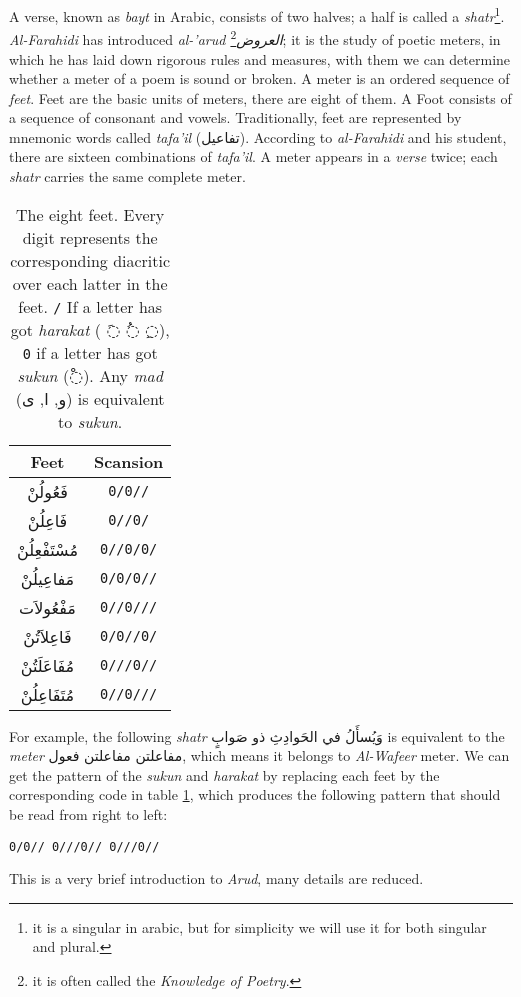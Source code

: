 \documentclass[12pt]{report}
\begin{document}
A verse, known as \textit{bayt} in Arabic, consists of two halves; a half is
called a \textit{shatr}\footnote{it is a singular in arabic, but for simplicity
we will use it for both singular and plural.}. %
\textit{Al-Farahidi} has introduced \textit{al-'arud
\textarabic{العروض}}\footnote{it is often called the \textit{Knowledge of
Poetry}.}; it is the study of poetic meters, in which he has laid down rigorous
rules and measures, with them we can determine whether a meter of a poem is sound
or broken. A meter is an ordered sequence of \textit{feet}. Feet are the basic
units of meters, there are eight of them. A Foot consists of a sequence of
consonant and vowels. Traditionally, feet are represented by mnemonic words
called \textit{tafa'il} (\textarabic{تفاعيل}).  According to \textit{al-Farahidi}
and his student, there are sixteen combinations of \textit{tafa'il}. A meter
appears in a \textit{verse} twice; each \textit{shatr} carries the same complete
meter.%

\begin{table}[!t]
  \centering
  \begin{tabular}{|c|c|} 
    \hline
    \textbf{Feet} & \textbf{Scansion} \\ 
    \hline
    \textarabic{فَعُولُنْ}  & \texttt{0/0//}\\
    \textarabic{فَاعِلُنْ}  & \texttt{0//0/}\\
    \textarabic{مُسْتَفْعِلُنْ}& \texttt{0//0/0/}\\
    \textarabic{مَفاعِيلُنْ}& \texttt{0/0/0//}\\
    \textarabic{مَفْعُولاَت} & \texttt{0//0///}\\
    \textarabic{فَاعِلاَتُنْ} & \texttt{0/0//0/}\\
    \textarabic{مُفَاعَلَتُنْ}& \texttt{0///0//}\\
    \textarabic{مُتَفَاعِلُنْ}& \texttt{0//0///}\\
    \hline
  \end{tabular}
  \caption{The eight feet. Every digit represents the corresponding diacritic
over each latter in the feet. \texttt{/} If a letter has got \textit{harakat} (
\textarabic{◌َ} \textarabic{◌ُ} \textarabic{◌ِ}), \texttt{0} if a letter has got
\textit{sukun} (\textarabic{◌ْ}). Any \textit{mad} (\textarabic{و, ا, ى}) is
equivalent to \textit{sukun}.}\label{arud:feet}
\end{table}


For example, the following \textit{shatr} \textarabic{وَيُسأَلُ في الحَوادِثِ ذو صَوابٍ} is
equivalent to the \textit{meter} \textarabic{مفاعلتن مفاعلتن فعول}, which means
it belongs to \textit{Al-Wafeer} meter. We can get the pattern of the
\textit{sukun} and \textit{harakat} by replacing each feet by the corresponding
code in table \ref{arud:feet}, which produces the following pattern that should
be read from right to left:%
\begin{flushright}
  {\texttt{0/0// 0///0// 0///0//}} %
\end{flushright}
This is a very brief introduction to \textit{Arud}, many details are reduced.
\end{document}
